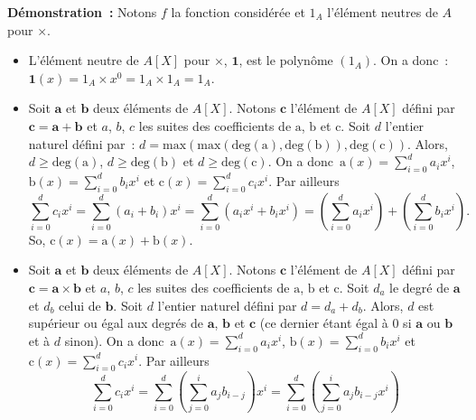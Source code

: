 \noindent\textbf{Démonstration :} 
    Notons $f$ la fonction considérée et $1_A$ l'élément neutres de $A$ pour $\times$.  
    \begin{itemize}[nosep]
        \item L'élément neutre de $A[X]$ pour $\times$, $\mathbf{1}$, est le polynôme $(1_A)$. 
            On a donc : $\mathbf{1}(x) = 1_A \times x^0 = 1_A \times 1_A = 1_A$.
        \item Soit $\mathbf{a}$ et $\mathbf{b}$ deux éléments de $A[X]$.
            Notons $\mathbf{c}$ l'élément de $A[X]$ défini par $\mathbf{c} = \mathbf{a} + \mathbf{b}$ et $a$, $b$, $c$ les suites des coefficients de $\mathrm{a}$, $\mathrm{b}$ et $\mathrm{c}$.
            Soit $d$ l'entier naturel défini par : $d = \mathrm{max}(\mathrm{max}(\mathrm{deg}(\mathrm{a}), \mathrm{deg}(\mathrm{b})), \mathrm{deg}(\mathrm{c}))$.
            Alors, $d \geq \mathrm{deg}(\mathrm{a})$, $d \geq \mathrm{deg}(\mathrm{b})$ et $d \geq \mathrm{deg}(\mathrm{c})$.
            On a donc $\mathrm{a}(x) = \sum_{i=0}^d a_i x^i$, $\mathrm{b}(x) = \sum_{i=0}^d b_i x^i$ et $\mathrm{c}(x) = \sum_{i=0}^d c_i x^i$. 
            Par ailleurs
            \begin{equation*}
                \sum_{i=0}^d c_i x^i = \sum_{i=0}^d (a_i + b_i) x^i
                    = \sum_{i=0}^d (a_i x^i + b_i x^i)
                    = \left( \sum_{i=0}^d a_i x^i \right) + \left( \sum_{i=0}^d b_i x^i \right) .
            \end{equation*}
            So, $\mathrm{c}(x) = \mathrm{a}(x) + \mathrm{b}(x)$.
        \item Soit $\mathbf{a}$ et $\mathbf{b}$ deux éléments de $A[X]$.
            Notons $\mathbf{c}$ l'élément de $A[X]$ défini par $\mathbf{c} = \mathbf{a} \times \mathbf{b}$ et $a$, $b$, $c$ les suites des coefficients de $\mathrm{a}$, $\mathrm{b}$ et $\mathrm{c}$.
            Soit $d_a$ le degré de $\mathbf{a}$ et $d_b$ celui de $\mathbf{b}$. 
            Soit $d$ l'entier naturel défini par $d = d_a + d_b$.
            Alors, $d$ est supérieur ou égal aux degrés de $\mathbf{a}$, $\mathbf{b}$ et $\mathbf{c}$ (ce dernier étant égal à $0$ si $\mathbf{a}$ ou $\mathbf{b}$ et à $d$ sinon).
            On a donc $\mathrm{a}(x) = \sum_{i=0}^d a_i x^i$, $\mathrm{b}(x) = \sum_{i=0}^d b_i x^i$ et $\mathrm{c}(x) = \sum_{i=0}^d c_i x^i$. 
            Par ailleurs
            \begin{equation*}
                \sum_{i=0}^d c_i x^i 
                    = \sum_{i=0}^d \left( \sum_{j=0}^i a_j b_{i-j} \right) x^i
                    = \sum_{i=0}^d \left( \sum_{j=0}^i a_j b_{i-j} x^i \right)

\end{equation*}
\end{itemize}
